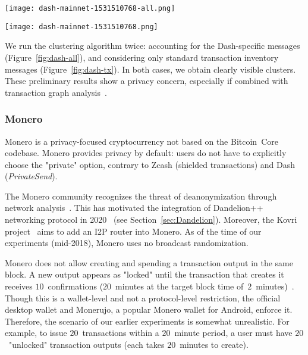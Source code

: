 \begin{figure*}
	\centering
	\begin{minipage}{0.5\textwidth}
		\centering
		\texttt{[image: dash-mainnet-1531510768-all.png]}
		\caption{Transaction clustering for Dash (messages and transactions).}
		\label{fig:dash-all}
	\end{minipage}\hfill
	\begin{minipage}{0.5\textwidth}
		\centering
		\texttt{[image: dash-mainnet-1531510768.png]}
		\caption{Transaction clustering for Dash (transactions only).}
		\label{fig:dash-tx}
	\end{minipage}\hfill
\end{figure*}

We run the clustering algorithm twice: accounting for the Dash-specific messages (Figure~\ref{fig:dash-all}), and considering only standard transaction inventory messages (Figure~\ref{fig:dash-tx}).
In both cases, we obtain clearly visible clusters.
These preliminary results show a privacy concern, especially if combined with transaction graph analysis~\cite{Kalodner2017}.


\subsubsection{Monero}

Monero is a privacy-focused cryptocurrency not based on the Bitcoin~Core codebase.
Monero provides privacy by default: users do not have to explicitly choose the "private" option, contrary to Zcash (shielded transactions) and Dash (\textit{PrivateSend}).

The Monero community recognizes the threat of deanonymization through network analysis~\cite{user36432017, manontheinside2016, expez2016, Cameron2016}.
This has motivated the integration of Dandelion++ networking protocol in 2020~\cite{ErCiccione2020} (see Section~\ref{sec:Dandelion}).
Moreover, the Kovri project~\cite{Kovri} aims to add an I2P router into Monero.
As of the time of our experiments (mid-2018), Monero uses no broadcast randomization.

Monero does not allow creating and spending a transaction output in the same block.
A new output appears as "locked" until the transaction that creates it receives $10$~confirmations ($20$~minutes at the target block time of~$2$~minutes)~\cite{dpzz2017}.
Though this is a wallet-level and not a protocol-level restriction, the official desktop wallet and Monerujo, a popular Monero wallet for Android, enforce it.
Therefore, the scenario of our earlier experiments is somewhat unrealistic.
For example, to issue $20$~transactions within a $20$~minute period, a user must have $20$~"unlocked" transaction outputs (each takes $20$~minutes to create).

